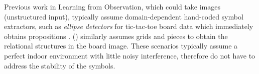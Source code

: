 
Previous work in Learning from Observation, which could take images (unstructured input),
typically assume domain-dependent hand-coded symbol extractors,
such as \emph{ellipse detectors} for tic-tac-toe board data
which immediately obtains propositions \cite{BarbuNS10}.
\citeauthor{Kaiser12} (\citeyear{Kaiser12}) similarly assumes grids and pieces
to obtain the relational structures in the board image.
These scenarios typically assume a perfect indoor environment with little noisy interference,
therefore do not have to address the stability of the symbols.






